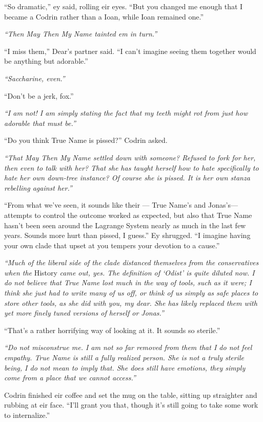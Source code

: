 ``So dramatic,'' ey said, rolling eir eyes. ``But you changed me enough that I became a Codrin rather than a Ioan, while Ioan remained one.''

\emph{``Then May Then My Name tainted em in turn.''}

``I miss them,'' Dear's partner said. ``I can't imagine seeing them together would be anything but adorable.''

\emph{``Saccharine, even.''}

``Don't be a jerk, fox.''

\emph{``I am not! I am simply stating the fact that my teeth might rot from just how adorable that must be.''}

``Do you think True Name is pissed?'' Codrin asked.

\emph{``That May Then My Name settled down with someone? Refused to fork for her, then even to talk with her? That she has taught herself how to hate specifically to hate her own down-tree instance? Of course she is pissed. It is her own stanza rebelling against her.''}

``From what we've seen, it sounds like their — True Name's and Jonas's—attempts to control the outcome worked as expected, but also that True Name hasn't been seen around the Lagrange System nearly as much in the last few years. Sounds more hurt than pissed, I guess.'' Ey shrugged. ``I imagine having your own clade that upset at you tempers your devotion to a cause.''

\emph{``Much of the liberal side of the clade distanced themselves from the conservatives when the} History \emph{came out, yes. The definition of `Odist' is quite diluted now. I do not believe that True Name lost much in the way of tools, such as it were; I think she just had to write many of us off, or think of us simply as safe places to store other tools, as she did with you, my dear. She has likely replaced them with yet more finely tuned versions of herself or Jonas.''}

``That's a rather horrifying way of looking at it. It sounds so sterile.''

\emph{``Do not misconstrue me. I am not so far removed from them that I do not feel empathy. True Name is still a fully realized person. She is not a truly sterile being, I do not mean to imply that. She does still have emotions, they simply come from a place that we cannot access.''}

Codrin finished eir coffee and set the mug on the table, sitting up straighter and rubbing at eir face. ``I'll grant you that, though it's still going to take some work to internalize.''

